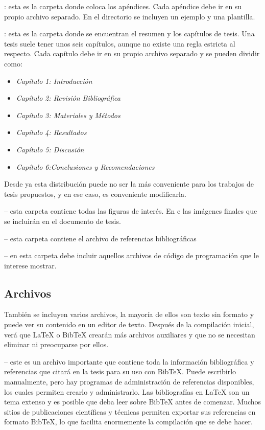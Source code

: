 : esta es la carpeta donde coloca los apéndices. Cada apéndice debe ir en su propio archivo  separado. En el directorio se incluyen un ejemplo y una plantilla.

: esta es la carpeta donde se encuentran el resumen y los capítulos de tesis. Una tesis suele tener unos seis capítulos, aunque no existe una regla estricta al respecto. Cada capítulo debe ir en su propio archivo  separado y se pueden dividir como:

\begin{itemize}
	\item \textit{Capítulo 1: Introducción}
	\item \textit{Capítulo 2: Revisión Bibliográfica}
	\item \textit{Capítulo 3: Materiales y Métodos}
	\item \textit{Capítulo 4: Resultados}
	\item \textit{Capítulo 5: Discusión}
	\item \textit{Capítulo 6:Conclusiones y  Recomendaciones}
\end{itemize}


Desde ya esta distribución puede no ser la más conveniente para los trabajos de tesis propuestos, y en ese caso, es conveniente modificarla. 

 -- esta carpeta contiene todas las figuras de interés. En e las imágenes finales que se incluirán en el documento de tesis.

 -- esta carpeta contiene el archivo de referencias bibliográficas 

 -- en esta carpeta debe incluir aquellos archivos de código de programación que le interese mostrar.

\subsection{Archivos}

También se incluyen varios archivos, la mayoría de ellos son texto sin formato y puede ver su contenido en un editor de texto. Después de la compilación inicial, verá que \LaTeX{}  o BibTeX crearán más archivos auxiliares y que no se necesitan eliminar ni preocuparse por ellos.

 -- este es un archivo importante que contiene toda la información bibliográfica y referencias que citará en la tesis para su uso con BibTeX. Puede escribirlo manualmente, pero hay programas de administración de referencias disponibles, los cuales permiten crearlo y administrarlo. Las bibliografías en \LaTeX{} son un tema extenso y es posible que deba leer sobre BibTeX antes de comenzar. Muchos sitios de publicaciones científicas y técnicas permiten exportar sus referencias en formato BibTeX, lo que facilita enormemente la compilación que se debe hacer.

